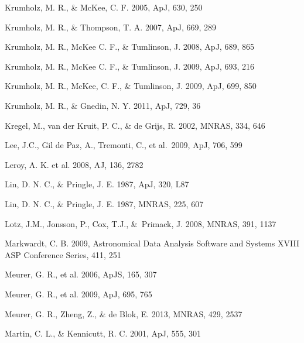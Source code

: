\documentclass[12pt,preprint]{aastex}
\begin{document}
\begin{thebibliography}{}
 Krumholz, M. R., \& McKee, C. F. 2005, ApJ, 630, 250

 Krumholz, M. R., \& Thompson, T. A. 2007, ApJ, 669, 289

 Krumholz, M. R., McKee C. F., \& Tumlinson, J. 2008, ApJ, 689, 865

 Krumholz, M. R., McKee C. F., \& Tumlinson, J. 2009, ApJ, 693, 216

 Krumholz, M. R., McKee, C. F., \& Tumlinson, J. 2009, ApJ, 699, 850

 Krumholz, M. R., \& Gnedin,  N. Y. 2011, ApJ, 729, 36




 Kregel, M., van der Kruit, P. C., \& de Grijs, R. 2002, MNRAS, 334, 646

         Lee, J.C., Gil de Paz, A., Tremonti, C., et al.\ 2009, ApJ,
         706, 599 

 Leroy, A. K.  et al. 2008, AJ, 136, 2782

 Lin, D. N. C., \& Pringle, J. E. 1987, ApJ, 320, L87

 Lin, D. N. C., \& Pringle, J. E. 1987, MNRAS, 225, 607

         Lotz, J.M., Jonsson, P., Cox, T.J., \&\ Primack, J. 2008,
         MNRAS, 391, 1137

 Markwardt, C. B. 2009, Astronomical Data Analysis Software and Systems XVIII ASP Conference Series, 411, 251

 Meurer, G. R., et al. 2006, ApJS, 165, 307

 Meurer, G. R., et al. 2009, ApJ, 695, 765

 Meurer, G. R.,  Zheng, Z., \& de Blok, E. 2013, MNRAS, 429, 2537


 Martin, C. L., \& Kennicutt, R. C. 2001, ApJ, 555, 301


\end{thebibliography}
\end{document}
